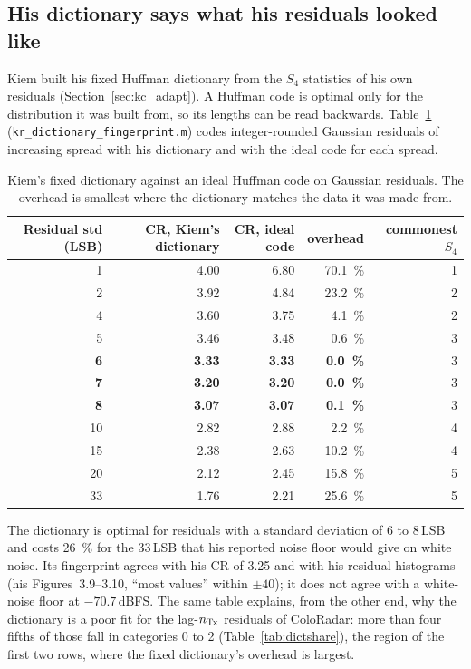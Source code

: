 \subsection{His dictionary says what his residuals looked like}
\label{sec:kr_fingerprint}

Kiem built his fixed Huffman dictionary from the $S_4$ statistics of his own
residuals (Section~\ref{sec:kc_adapt}). A Huffman code is optimal only for
the distribution it was built from, so its lengths can be read backwards.
Table~\ref{tab:kr_fp} (\texttt{kr\_dictionary\_fingerprint.m}) codes
integer-rounded Gaussian residuals of increasing spread with his dictionary and
with the ideal code for each spread.

\begin{table}[htbp]
\centering
\caption[What Kiem's dictionary was built for]{Kiem's fixed dictionary
against an ideal Huffman code on Gaussian residuals. The overhead is smallest
where the dictionary matches the data it was made from.}
\label{tab:kr_fp}
\small
\begin{tabular}{@{}rrrrr@{}}
\toprule
Residual std (LSB) & CR, Kiem's dictionary & CR, ideal code & overhead & commonest $S_4$\\
\midrule
1   & 4.00 & 6.80 & \SI{70.1}{\percent} & 1\\
2   & 3.92 & 4.84 & \SI{23.2}{\percent} & 2\\
4   & 3.60 & 3.75 & \SI{4.1}{\percent}  & 2\\
5   & 3.46 & 3.48 & \SI{0.6}{\percent}  & 3\\
\textbf{6}   & \textbf{3.33} & \textbf{3.33} & \textbf{\SI{0.0}{\percent}}  & 3\\
\textbf{7}   & \textbf{3.20} & \textbf{3.20} & \textbf{\SI{0.0}{\percent}}  & 3\\
\textbf{8}   & \textbf{3.07} & \textbf{3.07} & \textbf{\SI{0.1}{\percent}}  & 3\\
10  & 2.82 & 2.88 & \SI{2.2}{\percent}  & 4\\
15  & 2.38 & 2.63 & \SI{10.2}{\percent} & 4\\
20  & 2.12 & 2.45 & \SI{15.8}{\percent} & 5\\
33  & 1.76 & 2.21 & \SI{25.6}{\percent} & 5\\
\bottomrule
\end{tabular}
\end{table}

\noindent
The dictionary is optimal for residuals with a standard deviation of 6 to
8\,LSB and costs \SI{26}{\percent} for the 33\,LSB that his reported noise floor
would give on white noise. Its fingerprint agrees with his CR of 3.25 and with
his residual histograms (his Figures~3.9--3.10, ``most values'' within
$\pm 40$); it does not agree with a white-noise floor at $-70.7$\,dBFS. The same
table explains, from the other end, why the dictionary is a poor fit for the
lag-$n_{\mathrm{Tx}}$ residuals of ColoRadar: more than four fifths of those fall in
categories 0 to 2 (Table~\ref{tab:dictshare}), the region of the first two rows, where the
fixed dictionary's overhead is largest.

